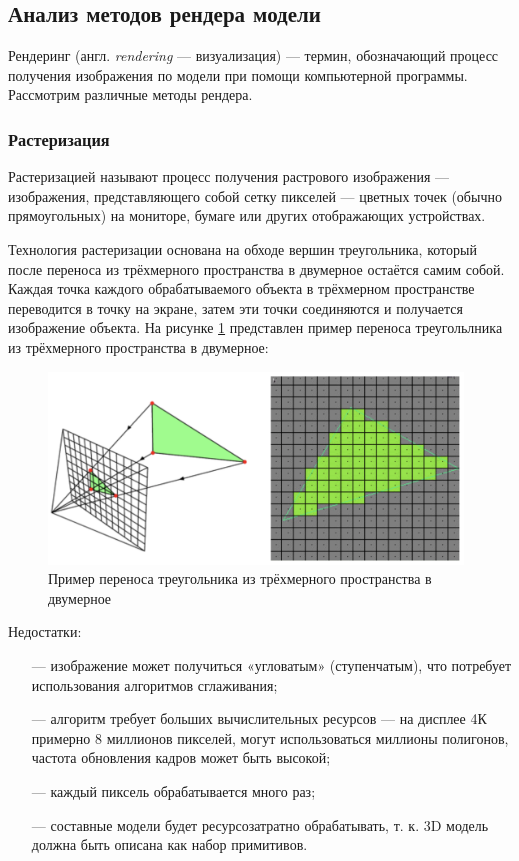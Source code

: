 \subsection{Анализ методов рендера модели}

Рендеринг (англ. \textit{rendering} --- визуализация) --- термин, обозначающий 
процесс получения изображения по модели при помощи компьютерной 
программы. 
Рассмотрим различные методы рендера.

\subsubsection{Растеризация}

Растеризацией \cite{rasterization} называют процесс получения растрового изображения --- 
изображения, представляющего собой сетку пикселей --- цветных точек 
(обычно прямоугольных) на мониторе, бумаге или других отображающих 
устройствах.

Технология растеризации основана на обходе вершин треугольника, 
который после переноса из трёхмерного пространства в двумерное остаётся 
самим собой.
Каждая точка каждого обрабатываемого объекта в трёхмерном 
пространстве переводится в точку на экране, затем эти точки соединяются и 
получается изображение объекта.
На рисунке \ref{fig:rasterization} представлен пример переноса треугольлника из трёхмерного пространства в двумерное:

\begin{figure}[h]
	\centering
	\captionsetup{justification=centering}
	\includegraphics[width=110mm]{img/rasterization.png}
	\caption{Пример переноса треугольника из трёхмерного 
		пространства в двумерное}
	\label{fig:rasterization}
\end{figure}

Недостатки:
\begin{itemize}[leftmargin=1.6\parindent]
	\item[---] изображение может получиться «угловатым» (ступенчатым), что 
	потребует использования алгоритмов сглаживания;
	\item[---] алгоритм требует больших вычислительных ресурсов --- на дисплее 4К 
	примерно 8 миллионов пикселей, могут использоваться миллионы полигонов, 
	частота обновления кадров может быть высокой;
	\item[---] каждый пиксель обрабатывается много раз;
	\item[---] составные модели будет ресурсозатратно обрабатывать, т. к. 3D модель должна быть описана как набор примитивов.
\end{itemize}

